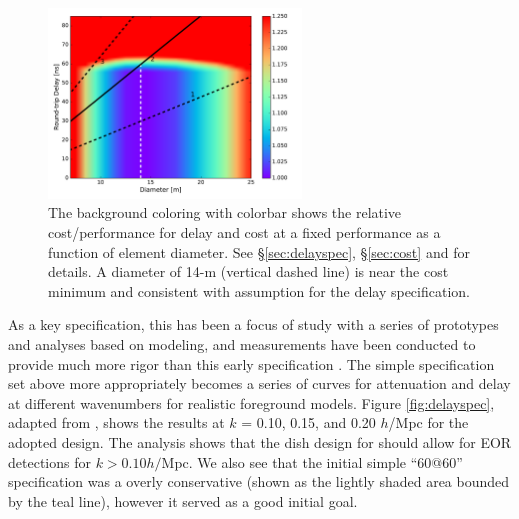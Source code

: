 \documentclass[preprint,11pt]{aastex}
\begin{document}
\begin{figure}[t]
\centerline{
\includegraphics[width=0.6\textwidth]{plots/costfig.pdf} 
}
\caption{\small The background coloring with colorbar shows the relative cost/performance for delay and cost at a fixed performance as a function of element diameter.  See \S\ref{sec:delayspec}, \S\ref{sec:cost} and \cite{elementmemo} for details.  A diameter of 14-m (vertical dashed line) is near the cost minimum and consistent with assumption for the delay specification.
\label{fig:costfig}}
\end{figure}

As a key specification, this has been a focus of study with a series of prototypes and analyses based on modeling, and measurements have been conducted to provide much more rigor than this early specification \citep{ewall-wice_et_al2016-EoXLimits,neben_et_al2016,thyagarajan_et_al2016,patra_et_al0216}.  The simple specification set above more appropriately becomes a series of curves for attenuation and delay at different wavenumbers for realistic foreground models.  Figure \ref{fig:delayspec}, adapted from \cite{thyagarajan_et_al2016}, shows the results at $k$ = 0.10, 0.15, and 0.20 $h$/Mpc for the adopted design.  The analysis shows that
the dish design for should allow for EOR detections for $k>0.10 h/$Mpc.  We also see that the initial simple ``60@60'' specification was a overly conservative (shown as the lightly shaded area bounded by the teal line), however it served as a good initial goal.
\end{document}
